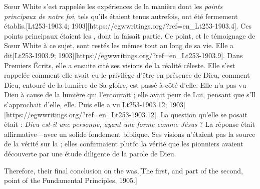 Sœur White s'est rappelée les expériences de la manière dont les \textit{points principaux de notre foi}, tels qu'ils étaient tenus autrefois, ont été fermement établis.[Lt253-1903.4; 1903][https://egwwritings.org/?ref=en\_Lt253-1903.4]. Ces points principaux étaient les , dont la  faisait partie. Ce point, et le témoignage de Sœur White à ce sujet, sont restés les mêmes tout au long de sa vie. Elle a dit[Lt253-1903.9; 1903][https://egwwritings.org/?ref=en\_Lt253-1903.9]. Dans Premiers Écrits, elle a ensuite cité ses visions de la réalité céleste. Elle s'est rappelée comment elle avait eu le privilège d'être en présence de Dieu, comment Dieu, entouré de la lumière de Sa gloire, est passé à côté d'elle. Elle n'a pas vu Dieu à cause de la lumière qui l'entourait ; elle avait peur de Lui, pensant que s'Il s'approchait d'elle, elle. Puis elle a vu[Lt253-1903.12; 1903][https://egwwritings.org/?ref=en\_Lt253-1903.12]. La question qu'elle se posait était : \textit{Dieu est-il une personne, ayant une forme comme Jésus} ? La réponse était affirmative—avec un solide fondement biblique. Ses visions n'étaient pas la source de la vérité sur la  ; elles confirmaient plutôt la vérité que les pionniers avaient découverte par une étude diligente de la parole de Dieu.


Therefore, their final conclusion on the  was,[The first, and part of the second, point of the Fundamental Principles, 1905.]


